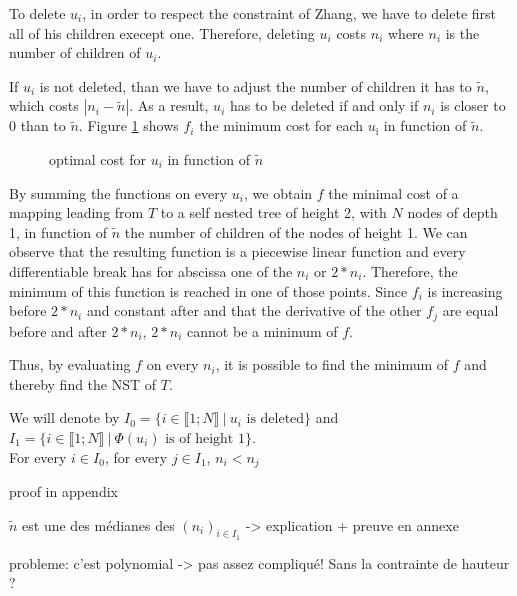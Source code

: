 To delete $u_{i}$, in order to respect the constraint of Zhang, we
have to delete first all of his children execept one. Therefore,
deleting $u_{i}$ costs $n_{i}$ where $n_{i}$ is the number of children
of $u_{i}$.

If $u_{i}$ is not deleted, than we have to adjust the number of
children it has to $\tilde{n}$, which costs
$\left|n_{i} - \tilde{n}\right|$. As a result, $u_{i}$ has to be
deleted if and only if $n_{i}$ is closer to 0 than to
$\tilde{n}$. Figure \ref{fig:optimalcost} shows $f_{i}$ the minimum
cost for each $u_{î}$ in function of $\tilde{n}$.

\begin{figure}
  \centering
  \caption{optimal cost for $u_{i}$ in function of $\tilde{n}$}
  \label{fig:optimalcost}
\end{figure}

By summing the functions on every $u_{i}$, we obtain $f$ the minimal cost
of a mapping leading from $T$ to a self nested tree of height 2, with
$N$ nodes of depth 1, in function of $\tilde{n}$ the number of
children of the nodes of height 1. We can observe that the resulting
function is a piecewise linear function and every differentiable break
has for abscissa one of the $n_{i}$ or $2*n_{i}$. Therefore, the
minimum of this function is reached in one of those points. Since
$f_{i}$ is increasing before $2*n_{i}$ and constant after and that the
derivative of the other $f_{j}$ are equal before and after $2*n_{i}$,
$2*n_{i}$ cannot be a minimum of $f$.

Thus, by evaluating $f$ on every $n_{i}$, it is possible to find the
minimum of $f$ and thereby find the NST of $T$.

\begin{remark}
  We will denote by
  ${I_{0} = \{i \in \llbracket 1;N \rrbracket \ | \ u_{i} \text{ is
      deleted} \}}$ and ${I_{1} = \{i \in \llbracket 1;N \rrbracket \
    | \ 
    \Phi(u_{i}) \text{ is of height } 1 \}}$.\\
  For every $i \in I_{0}$, for every $j \in I_{1}$, $n_{i} < n_{j}$

proof in appendix

\end{remark}

\begin{remark}
$\tilde{n}$ est une des médianes des $(n_{i})_{i \in I_{1}}$
-> explication + preuve en annexe
\end{remark}

probleme: c'est polynomial -> pas assez compliqué!
Sans la contrainte de hauteur ?


